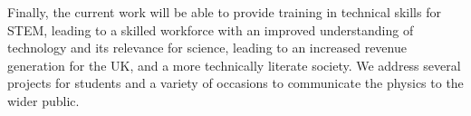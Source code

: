 \documentclass[11pt]{article}
\begin{document}
Finally, the current work will be able to provide training in
technical skills for STEM, leading to a skilled workforce with an
improved understanding of technology and its relevance for science,
leading to an increased revenue generation for the UK, and a more
technically literate society. We address several projects for students and
a variety of occasions to communicate the physics to the wider public.


%
%
%

\end{document}
